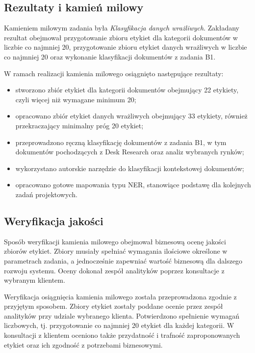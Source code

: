 \documentclass[12pt,a4paper]{report}
\begin{document}
\subsection{Rezultaty i kamień milowy}
Kamieniem milowym zadania była \textit{Klasyfikacja danych wrażliwych}. Zakładany rezultat obejmował przygotowanie zbioru etykiet dla kategorii dokumentów w liczbie co najmniej 20, przygotowanie zbioru etykiet danych wrażliwych w liczbie co najmniej 20 oraz wykonanie klasyfikacji dokumentów z zadania B1.

W ramach realizacji kamienia milowego osiągnięto następujące rezultaty:

\begin{itemize}
    \item stworzono zbiór etykiet dla kategorii dokumentów obejmujący 22 etykiety, czyli więcej niż wymagane minimum 20;
    \item opracowano zbiór etykiet danych wrażliwych obejmujący 33 etykiety, również przekraczający minimalny próg 20 etykiet;
    \item przeprowadzono ręczną klasyfikację dokumentów z zadania B1, w tym dokumentów pochodzących z Desk Research oraz analiz wybranych rynków;
    \item wykorzystano autorskie narzędzie do klasyfikacji kontekstowej dokumentów;
    \item opracowano gotowe mapowania typu NER, stanowiące podstawę dla kolejnych zadań projektowych.
\end{itemize}

\subsection{Weryfikacja jakości}
Sposób weryfikacji kamienia milowego obejmował biznesową ocenę jakości zbiorów etykiet. Zbiory musiały spełniać wymagania ilościowe określone w parametrach zadania, a jednocześnie zapewniać wartość biznesową dla dalszego rozwoju systemu. Oceny dokonał zespół analityków poprzez konsultacje z wybranym klientem.

Weryfikacja osiągnięcia kamienia milowego została przeprowadzona zgodnie z przyjętym sposobem. Zbiory etykiet zostały poddane ocenie przez zespół analityków przy udziale wybranego klienta. Potwierdzono spełnienie wymagań liczbowych, tj. przygotowanie co najmniej 20 etykiet dla każdej kategorii. W konsultacji z klientem oceniono także przydatność i trafność zaproponowanych etykiet oraz ich zgodność z potrzebami biznesowymi.
\end{document}
